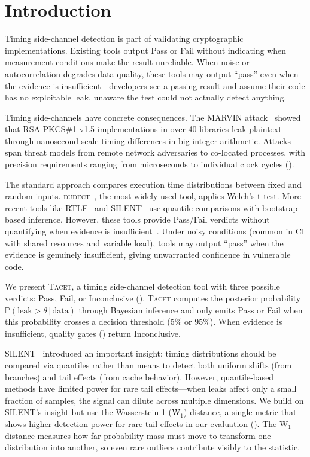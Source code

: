 \documentclass[letterpaper,twocolumn,10pt]{article}
\newcommand{\tacet}{\textsc{Tacet}\xspace}
\newcommand{\dudect}{\textsc{dudect}\xspace}
\newcommand{\rtlf}{\textsc{RTLF}\xspace}
\newcommand{\silent}{\textsc{SILENT}\xspace}
\newcommand{\prob}[1]{\mathbb{P}(#1)}
\newcommand{\given}{\,|\,}
\begin{document}
\section{Introduction}
\label{sec:intro}

Timing side-channel detection is part of validating cryptographic implementations.
Existing tools output Pass or Fail without indicating when measurement conditions
make the result unreliable. When noise or autocorrelation degrades data quality,
these tools may output ``pass'' even when the evidence is insufficient—developers
see a passing result and assume their code has no exploitable leak, unaware the
test could not actually detect anything.

Timing side-channels have concrete consequences. The MARVIN attack~\cite{marvin} showed
that RSA PKCS\#1 v1.5 implementations in over 40 libraries leak plaintext through
nanosecond-scale timing differences in big-integer arithmetic. Attacks span threat
models from remote network adversaries to co-located processes, with precision
requirements ranging from microseconds to individual clock cycles ().

The standard approach compares execution time distributions between fixed and
random inputs. \dudect~\cite{dudect}, the most widely used tool, applies Welch's
t-test. More recent tools like \rtlf~\cite{rtlf} and \silent~\cite{silent} use
quantile comparisons with bootstrap-based inference. However, these tools provide
Pass/Fail verdicts without quantifying when evidence is insufficient~\cite{trailofbits-dudect}.
Under noisy conditions (common in CI with shared resources and variable load), tools
may output ``pass'' when the evidence is genuinely insufficient, giving unwarranted
confidence in vulnerable code.

We present \tacet, a timing side-channel detection tool with three possible
verdicts: Pass, Fail, or Inconclusive (). \tacet
computes the posterior probability $\prob{\text{leak} > \theta \given \text{data}}$
through Bayesian inference and only emits Pass or Fail when this probability
crosses a decision threshold (5\% or 95\%). When evidence is insufficient,
quality gates () return Inconclusive.

\silent~\cite{silent} introduced an important insight: timing distributions should
be compared via quantiles rather than means to detect both uniform shifts (from branches)
and tail effects (from cache behavior). However, quantile-based methods have limited
power for rare tail effects—when leaks affect only a small fraction of samples, the signal
can dilute across multiple dimensions. We build on \silent's insight but use the
Wasserstein-1 (W$_1$) distance, a single metric that shows higher detection power for
rare tail effects in our evaluation (). The W$_1$ distance
measures how far probability mass must move to transform one distribution into another,
so even rare outliers contribute visibly
to the statistic.
\end{document}
